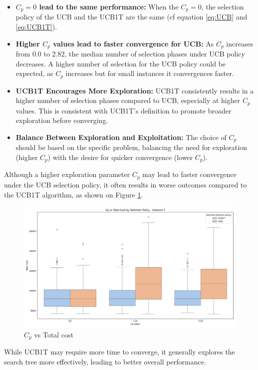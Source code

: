 \begin{itemize}
    \item \textbf{\( C_p = 0 \) lead to the same performance:}
          When the $C_p=0$, the selection policy of the UCB and the UCB1T are the same (cf equation \ref{eq:UCB} and \ref{eq:UCB1T}).
    \item \textbf{Higher \( C_p \) values lead to faster convergence for UCB:}
          As \( C_p \) increases from $0.0$ to $2.82$, the median number of selection phases under UCB policy decreases. A higher number of selection for the UCB policy could be expected, as $C_p$ increases but for small instances it convergences faster.

    \item \textbf{UCB1T Encourages More Exploration:}
          UCB1T consistently results in a higher number of selection phases compared to UCB, especially at higher \( C_p \) values. This is consistent with UCB1T's definition to promote broader exploration before converging.

    \item \textbf{Balance Between Exploration and Exploitation:}
          The choice of \( C_p \) should be based on the specific problem, balancing the need for exploration (higher \( C_p \)) with the desire for quicker convergence (lower \( C_p \)).
\end{itemize}

Although a higher exploration parameter $C_p$ may lead to faster convergence under the UCB selection policy, it often results in worse outcomes compared to the UCB1T algorithm, as shown on Figure \ref{fig:cp_vs_cost_3}.
\begin{figure}[!ht]
    \centering
    \includegraphics[width=\textwidth]{Figures/3 - cp_vs_cost.png}
    \caption{$C_p$ vs Total cost}
    \label{fig:cp_vs_cost_3}
\end{figure}
While UCB1T may require more time to converge, it generally explores the search tree more effectively, leading to better overall performance.





